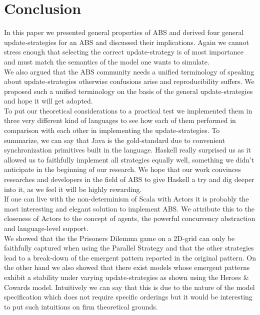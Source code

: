 \section{Conclusion}
In this paper we presented general properties of ABS and derived four general update-strategies for an ABS and discussed their implications. Again we cannot stress enough that selecting the correct update-strategy is of most importance and must match the semantics of the model one wants to simulate. \\
We also argued that the ABS community needs a unified terminology of speaking about update-strategies otherwise confusions arise and reproducibility suffers. We proposed such a unified terminology on the basis of the general update-strategies and hope it will get adopted. \\
To put our theoretical considerations to a practical test we implemented them in three very different kind of languages to see how each of them performed in comparison with each other in implementing the update-strategies. To summarize, we can say that Java is the gold-standard due to convenient synchronization primitives built in the language. Haskell really surprised us as it allowed us to faithfully implement all strategies equally well, something we didn't anticipate in the beginning of our research. We hope that our work convinces researches and developers in the field of ABS to give Haskell a try and dig deeper into it, as we feel it will be highly rewarding. \\
If one can live with the non-determinism of Scala with Actors it is probably the most interesting and elegant solution to implement ABS. We attribute this to the closeness of Actors to the concept of agents, the powerful concurrency abstraction and language-level support. \\
We showed that the the Prisoners Dilemma game on a 2D-grid can only be faithfully captured when using the Parallel Strategy and that the other strategies lead to a break-down of the emergent pattern reported in the original pattern. On the other hand we also showed that there exist models whose emergent patterns exhibit a stability under varying update-strategies as shown using the Heroes \& Cowards model. Intuitively we can say that this is due to the nature of the model specification which does not require specific orderings but it would be interesting to put such intuitions on firm theoretical grounds.